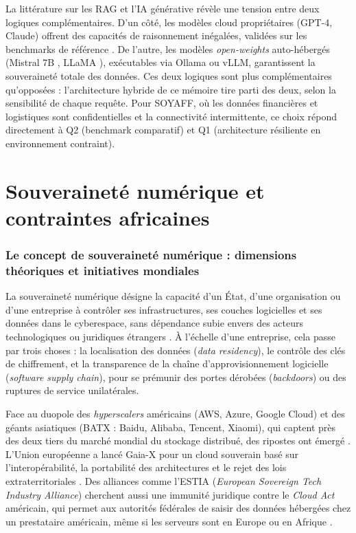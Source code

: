 La littérature sur les RAG et l'IA générative révèle une tension entre deux logiques complémentaires. D'un côté, les modèles cloud propriétaires (GPT-4, Claude) offrent des capacités de raisonnement inégalées, validées sur les benchmarks de référence \cite{touvronLlamaOpenEfficient2023}. De l'autre, les modèles \textit{open-weights} auto-hébergés (Mistral 7B \cite{fix_jiangMistral7B2023}, LLaMA \cite{touvronLlamaOpenEfficient2023}), exécutables via Ollama ou vLLM, garantissent la souveraineté totale des données. Ces deux logiques sont plus complémentaires qu'opposées : l'architecture hybride de ce mémoire tire parti des deux, selon la sensibilité de chaque requête. Pour SOYAFF, où les données financières et logistiques sont confidentielles et la connectivité intermittente, ce choix répond directement à Q2 (benchmark comparatif) et Q1 (architecture résiliente en environnement contraint).

\section{Souveraineté numérique et contraintes africaines}
\label{sec:Souveraineté_numérique_contraintes_africaines} 

\subsubsection{Le concept de souveraineté numérique : dimensions théoriques et initiatives mondiales}

La souveraineté numérique désigne la capacité d'un État, d'une organisation ou d'une entreprise à contrôler ses infrastructures, ses couches logicielles et ses données dans le cyberespace, sans dépendance subie envers des acteurs technologiques ou juridiques étrangers \cite{anssibsiCloudSovereignty2025}. À l'échelle d'une entreprise, cela passe par trois choses : la localisation des données (\textit{data residency}), le contrôle des clés de chiffrement, et la transparence de la chaîne d'approvisionnement logicielle (\textit{software supply chain}), pour se prémunir des portes dérobées (\textit{backdoors}) ou des ruptures de service unilatérales. 

Face au duopole des \textit{hyperscalers} américains (AWS, Azure, Google Cloud) et des géants asiatiques (BATX : Baidu, Alibaba, Tencent, Xiaomi), qui captent près des deux tiers du marché mondial du stockage distribué, des ripostes ont émergé \cite{anssibsiCloudSovereignty2025}. L'Union européenne a lancé Gaia-X pour un cloud souverain basé sur l'interopérabilité, la portabilité des architectures et le rejet des lois extraterritoriales \cite{anssibsiCloudSovereignty2025}. Des alliances comme l'ESTIA (\textit{European Sovereign Tech Industry Alliance}) cherchent aussi une immunité juridique contre le \textit{Cloud Act} américain, qui permet aux autorités fédérales de saisir des données hébergées chez un prestataire américain, même si les serveurs sont en Europe ou en Afrique \cite{anssibsiCloudSovereignty2025}.

